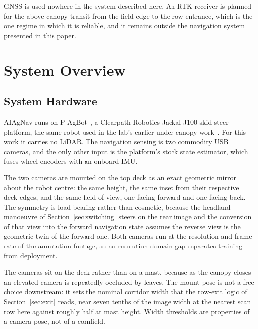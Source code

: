 \documentclass[conference]{IEEEtran}
\begin{document}
GNSS is used nowhere in the system described here. An RTK receiver is planned
for the above-canopy transit from the field edge to the row entrance, which is
the one regime in which it is reliable, and it remains outside the navigation
system presented in this paper.

\section{System Overview}
\subsection{System Hardware}
AIAgNav runs on P-AgBot~\cite{kim2022pagbot}, a Clearpath Robotics Jackal J100
skid-steer platform, the same robot used in the lab's earlier under-canopy
work~\cite{kim2024pagslam,kim2025pagnav}. For this work it carries no LiDAR.
The navigation sensing is two commodity USB cameras, and the only other input
is the platform's stock state estimator, which fuses wheel encoders with an
onboard IMU.

The two cameras are mounted on the top deck as an exact geometric mirror about
the robot centre: the same height, the same inset from their respective deck
edges, and the same field of view, one facing forward and one facing back. The
symmetry is load-bearing rather than cosmetic, because the headland manoeuvre of
Section~\ref{sec:switching} steers on the rear image and the conversion of that
view into the forward navigation state assumes the reverse view is the geometric
twin of the forward one. Both cameras run at the resolution and frame rate of
the annotation footage, so no resolution domain gap separates training from
deployment.

The cameras sit on the deck rather than on a mast, because as the canopy closes
an elevated camera is repeatedly occluded by leaves. The mount pose is not a
free choice downstream: it sets the nominal corridor width that the row-exit
logic of Section~\ref{sec:exit} reads, near seven tenths of the image width at
the nearest scan row here against roughly half at mast height. Width thresholds
are properties of a camera pose, not of a cornfield.
\end{document}
